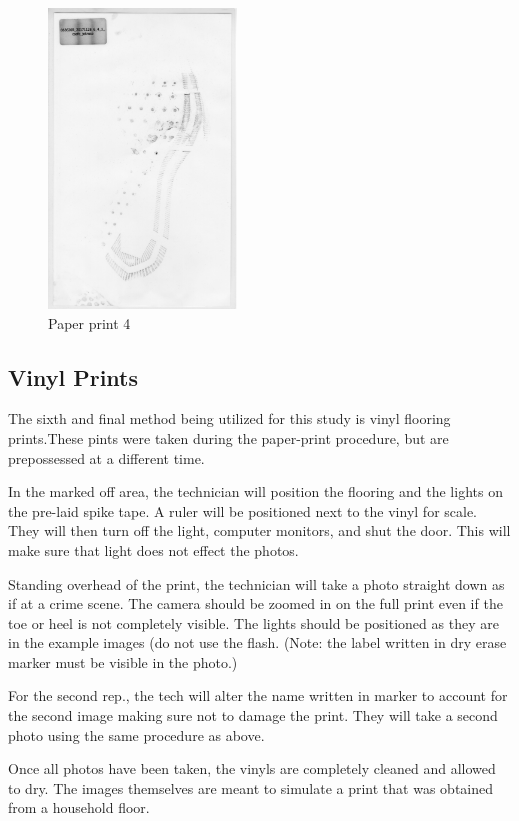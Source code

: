 \begin{figure}[!htp]
\centering
\includegraphics[width=5cm]{Baseline_Paper_4}
\caption{Paper print 4}
\label{Image 22}
\end{figure}

\subsection{Vinyl Prints}

   The sixth and final method being utilized for this study is vinyl flooring prints.These pints were taken during the paper-print procedure, but are prepossessed at a different time.
   
   In the marked off area, the technician will position the flooring and the lights on the pre-laid spike tape. A ruler will be positioned next to the vinyl for scale. They will then turn off the light, computer monitors, and shut the door. This will make sure that light does not effect the photos.

   Standing overhead of the print, the technician will take a photo straight down as if at a crime scene. The camera should be zoomed in on the full print even if the toe or heel is not completely visible. The lights should be positioned as they are in the example images (do not use the flash. (Note: the label written in dry erase marker must be visible in the photo.) 

   For the second rep., the tech will alter the name written in marker to account for the second image making sure not to damage the print. They will take a second photo using the same procedure as above. 

   Once all photos have been taken, the vinyls are completely cleaned and allowed to dry. The images themselves are meant to simulate a print that was obtained from a household floor. 


